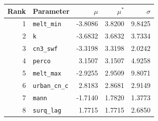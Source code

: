 \begin{tabular}{@{}rlrrr@{}}
\toprule
Rank & Parameter & $\mu$ & $\mu^*$ & $\sigma$ \\
\midrule
1 & \texttt{melt\_min} & -3.8086 & 3.8200 & 9.8425 \\
2 & \texttt{k} & -3.6832 & 3.6832 & 3.7334 \\
3 & \texttt{cn3\_swf} & -3.3198 & 3.3198 & 2.0242 \\
4 & \texttt{perco} & 3.1507 & 3.1507 & 4.9258 \\
5 & \texttt{melt\_max} & -2.9255 & 2.9509 & 9.8071 \\
6 & \texttt{urban\_cn\_c} & 2.8183 & 2.8681 & 2.9149 \\
7 & \texttt{mann} & -1.7140 & 1.7820 & 1.3773 \\
8 & \texttt{surq\_lag} & 1.7715 & 1.7715 & 2.6850 \\
\bottomrule
\end{tabular}

